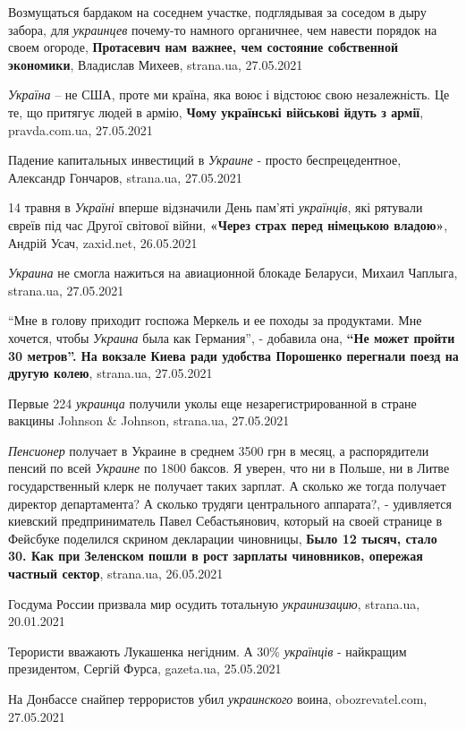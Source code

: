 Возмущаться бардаком на соседнем участке, подглядывая за соседом в дыру забора,
для \emph{украинцев} почему-то намного органичнее, чем навести порядок на своем
огороде, \textbf{Протасевич нам важнее, чем состояние собственной экономики}, Владислав Михеев, 
strana.ua, 27.05.2021

\emph{Україна} – не США, проте ми країна, яка воює і відстоює свою
незалежність. Це те, що притягує людей в армію, \textbf{Чому українські
військові йдуть з армії},  pravda.com.ua, 27.05.2021

Падение капитальных инвестиций в \emph{Украине} - просто беспрецедентное,
Александр Гончаров, strana.ua, 27.05.2021

14 травня в \emph{Україні} вперше відзначили День пам'яті \emph{українців}, які
рятували євреїв під час Другої світової війни, \textbf{«Через страх перед
німецькою владою»}, Андрій Усач, zaxid.net, 26.05.2021

\emph{Украина} не смогла нажиться на авиационной блокаде Беларуси, Михаил
Чаплыга, strana.ua, 27.05.2021

\enquote{Мне в голову приходит госпожа Меркель и ее походы за продуктами. Мне
хочется, чтобы \emph{Украина} была как Германия}, - добавила она, \textbf{\enquote{Не
может пройти 30 метров}. На вокзале Киева ради удобства Порошенко перегнали
поезд на другую колею}, strana.ua, 27.05.2021

Первые 224 \emph{украинца} получили уколы еще незарегистрированной в стране
вакцины Johnson \& Johnson, strana.ua, 27.05.2021

\emph{Пенсионер} получает в Украине в среднем 3500 грн в месяц, а распорядители
пенсий по всей \emph{Украине} по 1800 баксов.  Я уверен, что ни в Польше, ни в
Литве государственный клерк не получает таких зарплат. А сколько же тогда
получает директор департамента? А сколько трудяги центрального аппарата?, -
удивляется киевский предприниматель Павел Себастьянович, который на своей
странице в Фейсбуке поделился скрином декларации чиновницы, \textbf{Было 12
тысяч, стало 30. Как при Зеленском пошли в рост зарплаты чиновников, опережая
частный сектор}, strana.ua, 26.05.2021

Госдума России призвала мир осудить тотальную \emph{украинизацию}, strana.ua,
20.01.2021

Терористи вважають Лукашенка негідним. А 30\% \emph{українців} - найкращим
президентом, Сергій Фурса, gazeta.ua, 25.05.2021

На Донбассе снайпер террористов убил \emph{украинского} воина, obozrevatel.com,
27.05.2021

